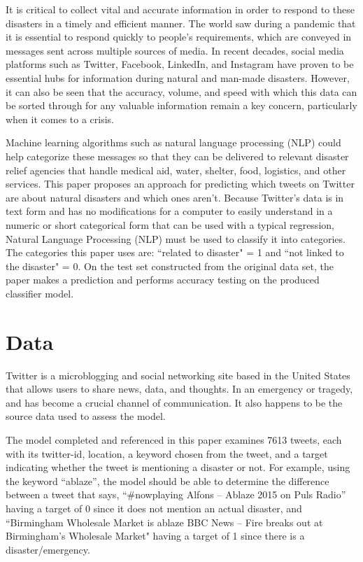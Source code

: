 \documentclass{article}
\begin{document}
It is critical to collect vital and accurate information in order to respond to these disasters in a timely and efficient manner. The world saw during a pandemic that it is essential to respond quickly to people's requirements, which are conveyed in messages sent across multiple sources of media. In recent decades, social media platforms such as Twitter, Facebook, LinkedIn, and Instagram have proven to be essential hubs for information during natural and man-made disasters. However, it can also be seen that the accuracy, volume, and speed with which this data can be sorted through for any valuable information remain a key concern, particularly when it comes to a crisis. 

Machine learning algorithms such as natural language processing (NLP) could help categorize these messages so that they can be delivered to relevant disaster relief agencies that handle medical aid, water, shelter, food, logistics, and other services. This paper proposes an approach for predicting which tweets on Twitter are about natural disasters and which ones aren't. Because Twitter's data is in text form and has no modifications for a computer to easily understand in a numeric or short categorical form that can be used with a typical regression, Natural Language Processing (NLP) must be used to classify it into categories. The categories this paper uses are: ``related to disaster" = 1 and ``not linked to the disaster" = 0. On the test set constructed from the original data set, the paper makes a prediction and performs accuracy testing on the produced classifier model. 


\section{Data}
Twitter is a microblogging and social networking site based in the United States that allows users to share news, data, and thoughts. In an emergency or tragedy, and has become a crucial channel of communication. It also happens to be the source data used to assess the model. 

The model completed and referenced in this paper examines 7613 tweets, each with its twitter-id, location, a keyword chosen from the tweet, and a target indicating whether the tweet is mentioning a disaster or not. For example, using the keyword ``ablaze”, the model should be able to determine the difference between a tweet that says, ``#nowplaying Alfons – Ablaze 2015 on Puls Radio” having a target of 0 since it does not mention an actual disaster, and ``Birmingham Wholesale Market is ablaze BBC News – Fire breaks out at Birmingham's Wholesale Market" having a target of 1 since there is a disaster/emergency. 
\end{document}
